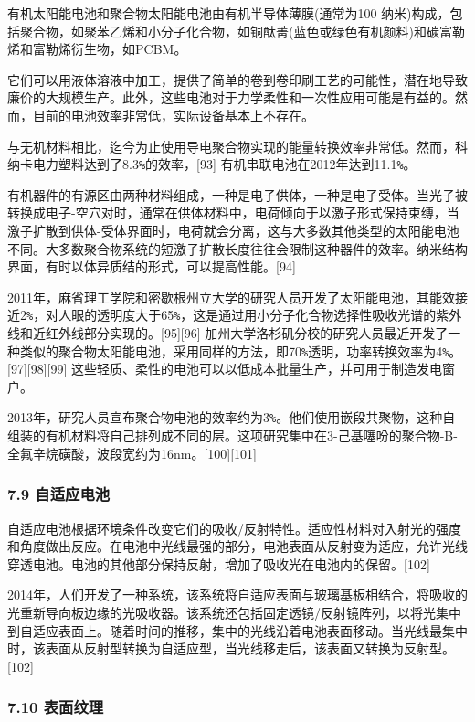 有机太阳能电池和聚合物太阳能电池由有机半导体薄膜(通常为100 纳米)构成，包括聚合物，如聚苯乙烯和小分子化合物，如铜酞菁(蓝色或绿色有机颜料)和碳富勒烯和富勒烯衍生物，如PCBM。

它们可以用液体溶液中加工，提供了简单的卷到卷印刷工艺的可能性，潜在地导致廉价的大规模生产。此外，这些电池对于力学柔性和一次性应用可能是有益的。然而，目前的电池效率非常低，实际设备基本上不存在。

与无机材料相比，迄今为止使用导电聚合物实现的能量转换效率非常低。然而，科纳卡电力塑料达到了8.3\verb`%`的效率，[93] 有机串联电池在2012年达到11.1\verb`%`。

有机器件的有源区由两种材料组成，一种是电子供体，一种是电子受体。当光子被转换成电子-空穴对时，通常在供体材料中，电荷倾向于以激子形式保持束缚，当激子扩散到供体-受体界面时，电荷就会分离，这与大多数其他类型的太阳能电池不同。大多数聚合物系统的短激子扩散长度往往会限制这种器件的效率。纳米结构界面，有时以体异质结的形式，可以提高性能。[94]

2011年，麻省理工学院和密歇根州立大学的研究人员开发了太阳能电池，其能效接近2\verb`%`，对人眼的透明度大于65\verb`%`，这是通过用小分子化合物选择性吸收光谱的紫外线和近红外线部分实现的。[95][96] 加州大学洛杉矶分校的研究人员最近开发了一种类似的聚合物太阳能电池，采用同样的方法，即70\verb`%`透明，功率转换效率为4\verb`%`。[97][98][99] 这些轻质、柔性的电池可以以低成本批量生产，并可用于制造发电窗户。

2013年，研究人员宣布聚合物电池的效率约为3\verb`%`。他们使用嵌段共聚物，这种自组装的有机材料将自己排列成不同的层。这项研究集中在3-己基噻吩的聚合物-B-全氟辛烷磺酸，波段宽约为16nm。[100][101]

\subsubsection{7.9 自适应电池}

自适应电池根据环境条件改变它们的吸收/反射特性。适应性材料对入射光的强度和角度做出反应。在电池中光线最强的部分，电池表面从反射变为适应，允许光线穿透电池。电池的其他部分保持反射，增加了吸收光在电池内的保留。[102]

2014年，人们开发了一种系统，该系统将自适应表面与玻璃基板相结合，将吸收的光重新导向板边缘的光吸收器。该系统还包括固定透镜/反射镜阵列，以将光集中到自适应表面上。随着时间的推移，集中的光线沿着电池表面移动。当光线最集中时，该表面从反射型转换为自适应型，当光线移走后，该表面又转换为反射型。[102]

\subsubsection{7.10 表面纹理}

